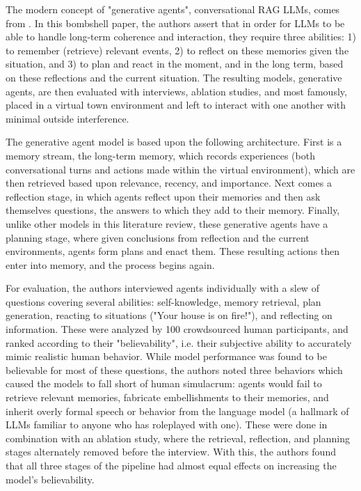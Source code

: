 The modern concept of "generative agents", conversational RAG LLMs, comes from \cite{Park2023}. In this bombshell paper, the authors assert that in order for LLMs to be able to handle long-term coherence and interaction, they require three abilities: 1) to remember (retrieve) relevant events, 2) to reflect on these memories given the situation, and 3) to plan and react in the moment, and in the long term, based on these reflections and the current situation. The resulting models, generative agents, are then evaluated with interviews, ablation studies, and most famously, placed in a virtual town environment and left to interact with one another with minimal outside interference.

The generative agent model is based upon the following architecture. First is a memory stream, the long-term memory, which records experiences (both conversational turns and actions made within the virtual environment), which are then retrieved based upon relevance, recency, and importance. Next comes a reflection stage, in which agents reflect upon their memories and then ask themselves questions, the answers to which they add to their memory. Finally, unlike other models in this literature review, these generative agents have a planning stage, where given conclusions from reflection and the current environments, agents form plans and enact them. These resulting actions then enter into memory, and the process begins again.
	
For evaluation, the authors interviewed agents individually with a slew of questions covering several abilities: self-knowledge, memory retrieval, plan generation, reacting to situations ("Your house is on fire!"), and reflecting on information. These were analyzed by 100 crowdsourced human participants, and ranked according to their "believability", i.e. their subjective ability to accurately mimic realistic human behavior. While model performance was found to be believable for most of these questions, the authors noted three behaviors which caused the models to fall short of human simulacrum: agents would fail to retrieve relevant memories, fabricate embellishments to their memories, and inherit overly formal speech or behavior from the language model (a hallmark of LLMs familiar to anyone who has roleplayed with one). These were done in combination with an ablation study, where the retrieval, reflection, and planning stages alternately removed before the interview. With this, the authors found that all three stages of the pipeline had almost equal effects on increasing the model's believability.

